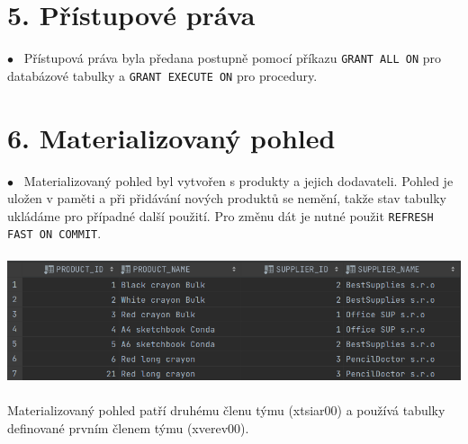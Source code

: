 \documentclass[12pt]{article}
\begin{document}
 \section*{5. Přístupové práva}
    $\bullet$~ Přístupová práva byla předana postupně pomocí příkazu \texttt{GRANT ALL ON} pro databázové tabulky a \texttt{GRANT EXECUTE ON} pro procedury.

\section*{6. Materializovaný pohled}
    $\bullet$~ Materializovaný pohled byl vytvořen s produkty a jejich dodavateli. Pohled je uložen v paměti a při přidávání nových produktů se nemění, takže stav tabulky ukládáme pro případné další použití. Pro změnu dát je nutné použit \texttt{REFRESH FAST ON COMMIT}.
    \\
    \\
    \includegraphics[scale=0.4936]{9.png}
    \\
    \\
    Materializovaný pohled patří druhému členu týmu (xtsiar00) a používá tabulky definované prvním členem týmu (xverev00).
\end{document}
